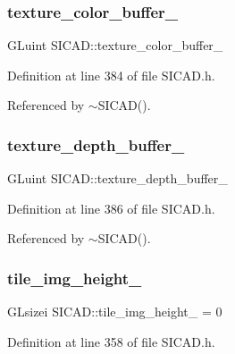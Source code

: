 \subsubsection{\texorpdfstring{texture\+\_\+color\+\_\+buffer\+\_\+}{texture\_color\_buffer\_}}
{\footnotesize\ttfamily G\+Luint S\+I\+C\+A\+D\+::texture\+\_\+color\+\_\+buffer\+\_\+\hspace{0.3cm}{\ttfamily [private]}}



Definition at line 384 of file S\+I\+C\+A\+D.\+h.



Referenced by $\sim$\+S\+I\+C\+A\+D().

\mbox{\label{classSICAD_a2fed5ac56bb2206fe8f6eccc9d784015}} 
\subsubsection{\texorpdfstring{texture\+\_\+depth\+\_\+buffer\+\_\+}{texture\_depth\_buffer\_}}
{\footnotesize\ttfamily G\+Luint S\+I\+C\+A\+D\+::texture\+\_\+depth\+\_\+buffer\+\_\+\hspace{0.3cm}{\ttfamily [private]}}



Definition at line 386 of file S\+I\+C\+A\+D.\+h.



Referenced by $\sim$\+S\+I\+C\+A\+D().

\mbox{\label{classSICAD_a2e6b01258527769e4066262ed002fc69}} 
\subsubsection{\texorpdfstring{tile\+\_\+img\+\_\+height\+\_\+}{tile\_img\_height\_}}
{\footnotesize\ttfamily G\+Lsizei S\+I\+C\+A\+D\+::tile\+\_\+img\+\_\+height\+\_\+ = 0\hspace{0.3cm}{\ttfamily [private]}}



Definition at line 358 of file S\+I\+C\+A\+D.\+h.

